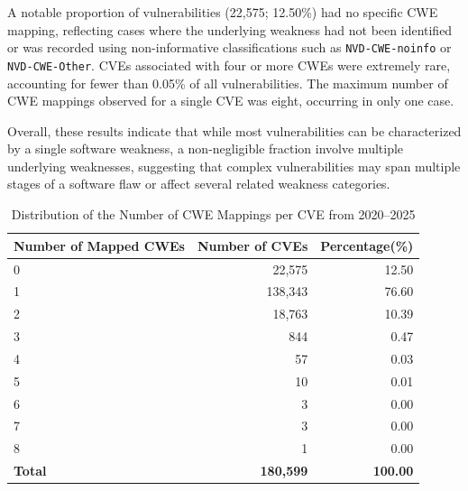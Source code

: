 \documentclass[conference,compsoc]{IEEEtran}
\begin{document}
A notable proportion of vulnerabilities (22,575; 12.50\%) had no specific CWE mapping, reflecting cases where the underlying weakness had not been identified or was recorded using non-informative classifications such as \texttt{NVD-CWE-noinfo} or \texttt{NVD-CWE-Other}. CVEs associated with four or more CWEs were extremely rare, accounting for fewer than 0.05\% of all vulnerabilities. The maximum number of CWE mappings observed for a single CVE was eight, occurring in only one case.

Overall, these results indicate that while most vulnerabilities can be characterized by a single software weakness, a non-negligible fraction involve multiple underlying weaknesses, suggesting that complex vulnerabilities may span multiple stages of a software flaw or affect several related weakness categories.




\begin{table}[t]
\centering
\scriptsize
\setlength{\tabcolsep}{3pt}
\caption{Distribution of the Number of CWE Mappings per CVE from 2020--2025}
\label{tab:cwe_mapping_distribution_2020_2025}
\begin{tabular}{lrr}
\toprule
\textbf{Number of Mapped CWEs } & \textbf{  Number of CVEs} & \textbf{  Percentage(\%)} \\
\midrule
0 & 22,575  & 12.50 \\
1 & 138,343 & 76.60 \\
2 & 18,763  & 10.39 \\
3 & 844      & 0.47 \\
4 & 57       & 0.03 \\
5 & 10       & 0.01 \\
6 & 3        & 0.00 \\
7 & 3        & 0.00 \\
8 & 1        & 0.00 \\
\midrule
\textbf{Total} & \textbf{180,599} & \textbf{100.00} \\
\bottomrule
\end{tabular}
\end{table}
\end{document}
